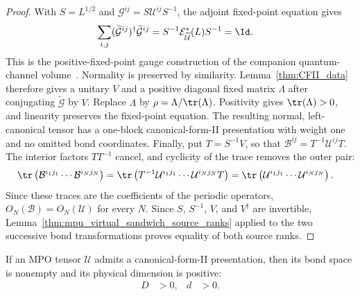 \begin{proof}\leanok
    With $S=L^{1/2}$ and $\mathcal G^{ij}=S\mathcal U^{ij}S^{-1}$,
    the adjoint fixed-point equation gives
    \begin{align}
        \sum_{i,j}(\widetilde{\mathcal G}^{ij})^\dagger
        \widetilde{\mathcal G}^{ij}
         & =S^{-1}\mathcal E_{\widetilde{\mathcal U}}^*(L)S^{-1}
        =\Id.
        \notag
    \end{align}
    This is the positive-fixed-point gauge construction of the companion
    quantum-channel volume~\cite[Trace-preserving gauge from an adjoint
        fixed point, Kraus form]{QICLean2026Blueprint}.
    Normality is preserved by similarity. Lemma~\ref{thm:CFII_data}
    therefore gives a unitary $V$ and a positive diagonal fixed matrix
    $\Lambda$ after conjugating $\widetilde{\mathcal G}$ by $V$.
    Replace $\Lambda$ by $\rho=\Lambda/\tr(\Lambda)$.
    Positivity gives $\tr(\Lambda)>0$, and linearity preserves the
    fixed-point equation. The resulting normal, left-canonical tensor
    has a one-block canonical-form-II presentation with weight one and
    no omitted bond coordinates. Finally, put $T=S^{-1}V$, so that
    $\mathcal B^{ij}=T^{-1}\mathcal U^{ij}T$. The interior factors
    $TT^{-1}$ cancel, and cyclicity of the trace removes the outer pair:
    \begin{align}
        \tr\left(\mathcal B^{i_1j_1}\cdots\mathcal B^{i_Nj_N}\right)
         & =\tr\left(T^{-1}\mathcal U^{i_1j_1}\cdots
        \mathcal U^{i_Nj_N}T\right)
        =\tr\left(\mathcal U^{i_1j_1}\cdots\mathcal U^{i_Nj_N}\right).
        \notag
    \end{align}
    Since these traces are the coefficients of the periodic operators,
    $O_N(\mathcal B)=O_N(\mathcal U)$ for every $N$.
    Since $S$, $S^{-1}$, $V$, and $V^\dagger$ are invertible,
    Lemma~\ref{thm:mpu_virtual_sandwich_source_ranks} applied to the two
    successive bond transformations proves equality of both source ranks.
\end{proof}

\begin{lemma}
    \label{thm:mpu_canonical_form_ii_positive_dimensions}
    \leanok
    If an MPO tensor $\mathcal U$ admits a canonical-form-II presentation, then
    its bond space is nonempty and its physical dimension is positive:
    \begin{align}
        D & >0, & d & >0.
    \end{align}
\end{lemma}

